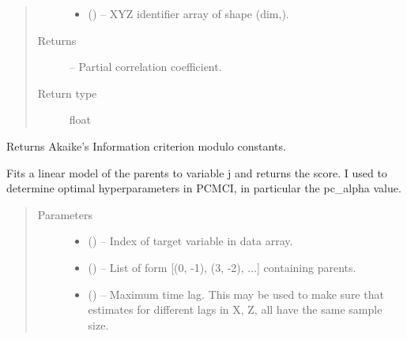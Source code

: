 \documentclass[letterpaper,10pt,english]{sphinxmanual}
\begin{document}
\begin{fulllineitems}
\begin{fulllineitems}
\begin{quote}
\begin{description}
\begin{itemize}
\item {} 
 () -- XYZ identifier array of shape (dim,).

\end{itemize}

\item[{Returns}] \leavevmode
{} -- Partial correlation coefficient.

\item[{Return type}] \leavevmode
float

\end{description}\end{quote}

\end{fulllineitems}


\begin{fulllineitems}
\label{\detokenize{index:tigramite.independence_tests.ParCorr.get_model_selection_criterion}}
Returns Akaike's Information criterion modulo constants.

Fits a linear model of the parents to variable j and returns the score.
I used to determine optimal hyperparameters in PCMCI, in particular
the pc\_alpha value.
\begin{quote}\begin{description}
\item[{Parameters}] \leavevmode\begin{itemize}
\item {} 
 () -- Index of target variable in data array.

\item {} 
 () -- List of form {[}(0, -1), (3, -2), ...{]} containing parents.

\item {} 
 (\sphinxstyleliteralemphasis{, }\sphinxstyleliteralemphasis{ (}\sphinxstyleliteralemphasis{)}\sphinxstyleliteralemphasis{}) -- Maximum time lag. This may be used to make sure that estimates for
different lags in X, Z, all have the same sample size.


\end{itemize}
\end{description}
\end{quote}
\end{fulllineitems}
\end{fulllineitems}
\end{document}
